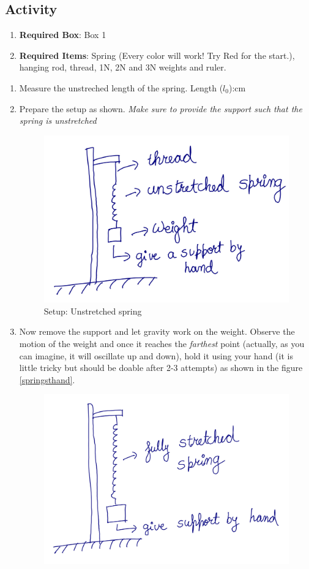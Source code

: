\documentclass[10pt]{article}
\begin{document}
\subsection{Activity}
\begin{enumerate}
\item \textbf{Required Box}: Box 1
\item \textbf{Required Items}: Spring (Every color will work! Try Red for the start.), hanging rod, thread, 1N, 2N and 3N weights and ruler.
\end{enumerate}
\begin{enumerate}
\item Measure the unstreched length of the spring. Length ($l_0$):\underline{\hspace{5cm}}cm
\item Prepare the setup as shown.  \emph{Make sure to provide the support such that the spring is unstretched}
\begin{figure}[h]
\label{springunhand}
\includegraphics[scale=.5]{springunhand}
\centering
\caption{Setup: Unstretched spring}
\end{figure}
\item Now remove the support and let gravity work on the weight.  Observe the motion of the weight and once it reaches the \emph{farthest} point (actually, as you can imagine, it will oscillate up and down), hold it using your hand (it is little tricky but should be doable after 2-3 attempts) as shown in the figure \ref{springsthand}. 
\begin{figure}[h]
\includegraphics[scale=.5]{springsthand}

\end{figure}
\end{enumerate}
\end{document}
